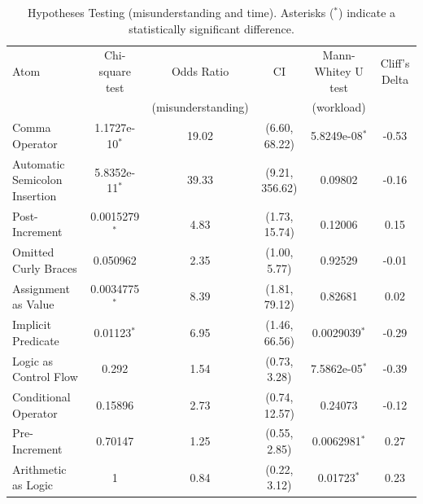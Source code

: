  \begin{table}[ht]
\caption{Hypotheses Testing (misunderstanding and time). Asterisks ($^{*}$) indicate a statistically significant difference.}

 \centering
 \begin{tabular}{lccc|cc}
   \toprule
Atom  & Chi-square test & Odds Ratio          & CI & Mann-Whitey U test & Cliff's Delta \\ 
     &         & (misunderstanding)  &                    & (workload)             & \\ \midrule
Comma Operator & 1.1727e-10$^{*}$ & 19.02 & (6.60, 68.22) & 5.8249e-08$^{*}$ & -0.53 \\ 
Automatic Semicolon Insertion & 5.8352e-11$^{*}$ & 39.33 & (9.21, 356.62) & 0.09802 & -0.16 \\ 
Post-Increment & 0.0015279$^{*}$ & 4.83 & (1.73, 15.74) & 0.12006 & 0.15 \\ 
Omitted Curly Braces & 0.050962 & 2.35 & (1.00, 5.77) & 0.92529 & -0.01 \\ 
Assignment as Value & 0.0034775$^{*}$ & 8.39 & (1.81, 79.12) & 0.82681 & 0.02 \\ 
Implicit Predicate & 0.01123$^{*}$ & 6.95 & (1.46, 66.56) & 0.0029039$^{*}$ & -0.29 \\ 
Logic as Control Flow & 0.292 & 1.54 & (0.73, 3.28) & 7.5862e-05$^{*}$ & -0.39 \\ 
Conditional Operator & 0.15896 & 2.73 & (0.74, 12.57) & 0.24073 & -0.12 \\ 
Pre-Increment & 0.70147 & 1.25 & (0.55, 2.85) & 0.0062981$^{*}$ & 0.27 \\ 
Arithmetic as Logic & 1 & 0.84 & (0.22, 3.12) & 0.01723$^{*}$ & 0.23 \\ 
    \bottomrule
 \end{tabular}
 \label{tab:hypothesis-testing}
 \end{table}


